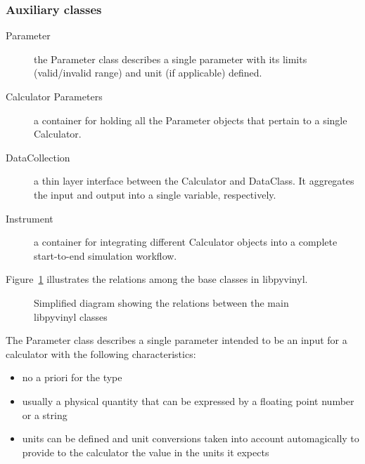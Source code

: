 \documentclass[11pt, a4paper]{article}
\begin{document}
\subsubsection{Auxiliary classes}
\label{sec:lpv_aux}

\begin{description}
\item[Parameter] the Parameter class describes a single parameter with its limits (valid/invalid range) and unit (if applicable) defined.
\item[Calculator Parameters] a container for holding all the Parameter objects that pertain to a single Calculator.
\item[DataCollection] a thin layer interface between the Calculator and DataClass. It aggregates the input and output into a single variable, respectively.
\item[Instrument] a container for integrating different Calculator objects into a complete start-to-end simulation workflow.
\end{description}

Figure~\ref{fig:libpyvinyl_class_relations} illustrates the relations among the
base classes in libpyvinyl.
\begin{figure}[tp]
  \caption{Simplified diagram showing the relations between the main libpyvinyl classes}
  \label{fig:libpyvinyl_class_relations}
\end{figure}

  The Parameter class describes a single parameter intended to be an input for a
  calculator with the following characteristics:
  \begin{itemize}
  \item no a priori for the type
  \item usually a physical quantity that can be expressed by a floating point number or a string
  \item units can be defined and unit conversions taken into account automagically to provide to the calculator the value in the units it expects
  \end{itemize}
\end{document}
